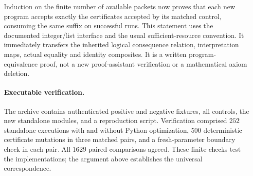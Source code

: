 Induction on the finite number of available packets now proves that each
new program accepts exactly the certificates accepted by its matched
control, consuming the same suffix on successful runs. This statement uses
the documented integer/list interface and the usual sufficient-resource
convention. It immediately transfers the inherited logical consequence
relation, interpretation maps, actual equality and identity composites.
It is a written program-equivalence proof, not a new proof-assistant
verification or a mathematical axiom deletion.

\paragraph{Executable verification.}
The archive contains authenticated positive and negative fixtures, all
controls, the new standalone modules, and a reproduction script. Verification
comprised $252$ standalone executions with and without Python optimization,
$500$ deterministic certificate mutations in three matched pairs, and a
fresh-parameter boundary check in each pair. All $1629$ paired comparisons
agreed. These finite checks test the implementations; the argument above
establishes the universal correspondence.
